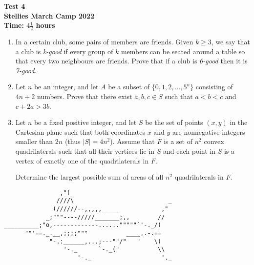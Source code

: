 \documentclass{article}
\begin{document}
\thispagestyle{empty}

\begin{center}
  \textbf{\Large Test 4}
  \\ \vspace{1em}
  \textbf{\large Stellies March Camp 2022}
  \\ \vspace{1em}
  \textbf{\large Time: $4\frac{1}{2}$ hours}
\end{center}

\vspace{24pt}

\begin{enumerate}[itemsep=12pt]

\item %
In a certain club, some pairs of members are friends. Given $k \geq 3$, 
we say that a club is \textit{k-good} if every group of $k$ members can be seated around a table so that every two neighbours are friends. Prove that if a club is \textit{6-good} then it is \textit{7-good}.

\item %
Let $n$ be an integer, and let $A$ be a subset of $\{0, 1, 2, \dotsc, 5^n\}$ consisting of $4n+2$ numbers.
Prove that there exist $a, b, c \in S$ such that $a < b < c$ and $c +2a > 3b$.

\item %
Let $n$ be a fixed positive integer, and let $S$ be the set of points $(x,y)$ in the Cartesian plane such that both coordinates $x$ and $y$ are nonnegative integers smaller than $2n$ (thus $|S| = 4n^2$).
Assume that $F$ is a set of $n^2$ convex quadrilaterals such that all their vertices lie in $S$ and each point in $S$ is a vertex of exactly one of the quadrilaterals in $F$.

Determine the largest possible sum of areas of all $n^2$ quadrilaterals in $F$.

\end{enumerate}

\vfill
\centering
\begin{BVerbatim}
                ,"(
               ////\                           _
              (//////--,,,,,_____            ,"
            _;"""----/////_______;,,        //
__________;"o,-------------......"""""`'-._/(
      ""'==._.__,;;;;"""           ____,.-.==
             "-.:______,...;---""/"   "    \(
                 '-._      `-._("           \\
                     '-._                    '._
\end{BVerbatim}
\end{document}
